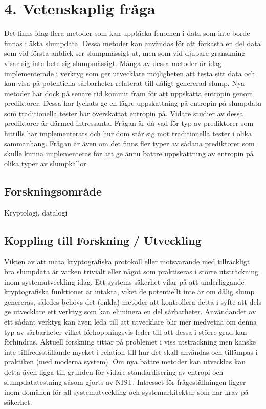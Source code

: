 \documentclass[a4paper,11pt]{report}
\begin{document}
\section*{4. Vetenskaplig fråga}
Det finns idag flera metoder som kan upptäcka fenomen i data som inte borde 
finnas i äkta slumpdata. Dessa metoder kan användas för att förkasta en del
data som vid första anblick ser slumpmässigt ut, men som vid djupare granskning
visar sig inte bete sig slumpmässigt. Många av dessa metoder är idag 
implementerade i verktyg som ger utvecklare möjligheten att testa sitt 
data och kan visa på potentiella sårbarheter relaterat till dåligt genererad 
slump. 
Nya metoder har dock på senare tid kommit fram för att uppskatta entropin genom
prediktorer. Dessa har lyckats ge en lägre uppskattning på entropin på 
slumpdata som traditionella tester har överskattat entropin på. 
Vidare studier av dessa prediktorer är därmed intressanta.
Frågan är då vad för typ av prediktorer som hittills har implementerats
och hur dom står sig mot traditionella tester i olika sammanhang. 
Frågan är även om det finns fler typer av sådana prediktorer som skulle
kunna implementeras för att ge ännu bättre uppskattning av entropin på olika
typer av slumpkällor. 
\subsection*{Forskningsområde}
Kryptologi, datalogi
\subsection*{Koppling till Forskning / Utveckling}
Vikten av att mata kryptografiska protokoll eller motsvarande med tillräckligt 
bra slumpdata är varken trivialt eller något som praktiseras i större
utsträckning inom systemutveckling idag. Ett systems säkerhet vilar på att 
underliggande kryptografiska funktioner är intakta, viket de potentiellt inte 
är om dålig slump genereras, således behövs det (enkla) metoder att kontrollera 
detta i syfte att dels ge utvecklare ett verktyg som kan eliminera en del
sårbarheter. Användandet av ett sådant verktyg kan även leda till att 
utvecklare blir mer medvetna om denna typ av sårbarheter vilket förhoppningsvis
leder till att dessa i större grad kan förhindras. Aktuell forskning 
tittar på problemet i viss utsträckning men kanske inte tillfredsställande 
mycket i relation till hur det skall användas och tillämpas i praktiken 
(med moderna system). Om nya bättre metoder kan utvecklas kan detta även
ligga till grunden för vidare standardisering av entropi och 
slumpdatatestning såsom gjorts av NIST.  Intresset för frågeställningen 
ligger inom domänen 
för all systemutveckling och systemarkitektur som har krav på säkerhet.
\end{document}
